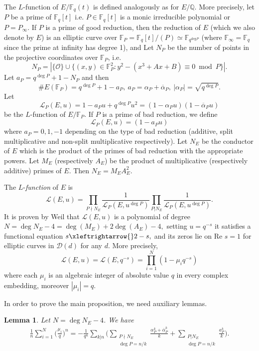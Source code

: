 \documentclass[12pt,reqno]{amsart}
\newcommand{\Q}{\mathbb{Q}}
\newcommand{\BF}{\mathbb{F}}
\newcommand{\CL}{\mathcal{L}}
\newtheorem{lem}{Lemma}[subsection]
\begin{document}
The $L$-function of $E/\BF_{q}(t)$ is defined analogously as for $E/\Q.$ More precisely, let $P$ be a prime of $\BF_{q}[t]$ i.e. $P \in \BF_{q}[t]$ is a monic irreducible polynomial or $P=P_{\infty}.$  If $P$ is a prime of good reduction, then the reduction of $E$ (which we also denote by $E$) is an elliptic curve over $\BF_{P}=\BF_{q}[t]/(P) \simeq \BF_{q^{\text{deg} P}}$ (where $\BF_{\infty}=\BF_{q}$ since the prime at infinity has degree 1), and
Let $N_P$ be the number of points in the projective coordinates over $\BF_{P}$, i.e. 
$$
N_P = | \{ \mathcal{O} \} \cup \{(x,y) \in \BF_{P}^2 : y^2 - (x^3 + Ax + B) \equiv 0\bmod P\} |.
$$
Let $a_P = q^{\deg P} + 1 - N_{P}$ and then 
$$
\#E(\BF_{P})= q^{\deg P} + 1 - a_P, \ a_P = \alpha_P + \overline{\alpha}_P, \ |\alpha_P |= \sqrt{q^{\deg P}}.
$$
Let 
$$
\mathcal{L}_P (E, u)= 1- a_P u + q^{\deg P} u^2= (1-\alpha_P u) (1 - \overline{\alpha}_P u)
$$
be the $L$-function of $E/\BF_{P}.$ If $P$ is a prime of bad reduction, we define
$$
\mathcal{L}_P(E,u)= (1-a_P u)
$$
where $a_P= 0, 1, -1$ depending on the type of bad reduction (additive, split multiplicative and non-split multiplicative respectively). Let $N_E$ be the conductor of $E$ which is the product of the primes of bad reduction with the appropriate powers. Let $M_E$ (respectively $A_E$) be the product of multiplicative (respectively additive) primes of $E$.
Then $N_E = M_E A_E^2$.

The $L$-\textit{function} of $E$ is
$$
\mathcal{L}(E,u)= \prod_{P \nmid N_E} \frac{1}{\mathcal{L}_P(E,u^{\deg P})} \prod_{P | N_E} \frac{1}{\mathcal{L}_P(E,u^{\deg P})}.
$$
It is proven by Weil that $\mathcal{L}(E,u)$ is a polynomial of degree $ N= \deg N_E - 4= \deg (M_{E}) + 2\deg(A_E) -4,$ setting $u=q^{-s}$ it satisfies a functional equation $s \xleftrightarrow{} 2-s,$ and its zeros lie on Re $s=1$ for elliptic curves in $\mathcal{D}(d)$ for any $d$. More precisely,
$$
\CL(E,u)= \CL(E,q^{-s})= \prod_{i=1}^{N} (1-\mu_i q^{-s}) 
$$
where each $\mu_i$ is an algebraic integer of absolute value $q$ in every complex embedding, moreover $|\mu_{i}| = q$.


In order to prove the main proposition, we need auxiliary lemmas. 

\begin{lem}\label{lemma1} Let $N = \deg N_E - 4$. We have
    \begin{align}\label{nthcoefficiets}
\frac{1}{n}\sum\limits_{i=1}^{N} \Big ( \frac{\mu_i}{q} \Big )^n = - \frac{1}{q^n} \sum\limits_{k |n} \Big (\sum_{\substack{P \nmid N_E \\ \deg P = n/k}} \frac{\alpha_{P}^k + \overline{\alpha}_{P}^k}{k} + \sum_{\substack{P | N_E \\ \deg P = n/k}} \frac{a_{P}^k}{k} \Big ).
\end{align}
\end{lem}
\end{document}
